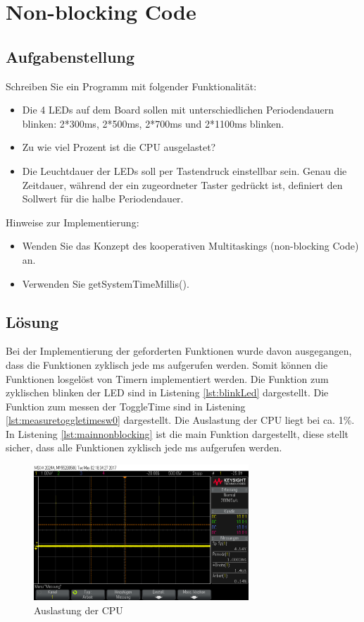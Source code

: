\section{Non-blocking Code}
\subsection{Aufgabenstellung}
Schreiben Sie ein Programm mit folgender Funktionalität:
\begin{itemize}%
		\item Die 4 LEDs auf dem Board sollen mit unterschiedlichen Periodendauern blinken: 2*300ms, 2*500ms, 2*700ms und 2*1100ms blinken.
		\item Zu wie viel Prozent ist die CPU ausgelastet?
		\item Die Leuchtdauer der LEDs soll per Tastendruck einstellbar sein. Genau die Zeitdauer, während der ein zugeordneter Taster gedrückt ist, definiert den Sollwert für die halbe Periodendauer.
\end{itemize}
Hinweise zur Implementierung:
\begin{itemize}
	\item Wenden Sie das Konzept des kooperativen Multitaskings (non-blocking Code) an.
	\item Verwenden Sie getSystemTimeMillis().
\end{itemize}

\subsection{Lösung}
Bei der Implementierung der geforderten Funktionen wurde davon ausgegangen, dass die Funktionen zyklisch jede ms aufgerufen werden. Somit können die Funktionen losgelöst von Timern implementiert werden.\newline
Die Funktion zum zyklischen blinken der LED sind in Listening \ref{lst:blinkLed} dargestellt. Die Funktion zum messen der ToggleTime sind in Listening \ref{lst:measuretoggletimesw0} dargestellt. \newline
Die Auslastung der CPU liegt bei ca. 1\%. In Listening \ref{lst:mainnonblocking} ist die main Funktion dargestellt, diese stellt sicher, dass alle Funktionen zyklisch jede ms aufgerufen werden.

\begin{figure}[h]
	\centering
	\includegraphics[width=0.7205\textwidth]{Images/scope_nonblockingcodepng}
	\caption[NonBlockingCode]{Auslastung der CPU}
	\label{image:nonblockingcode}
\end{figure}

